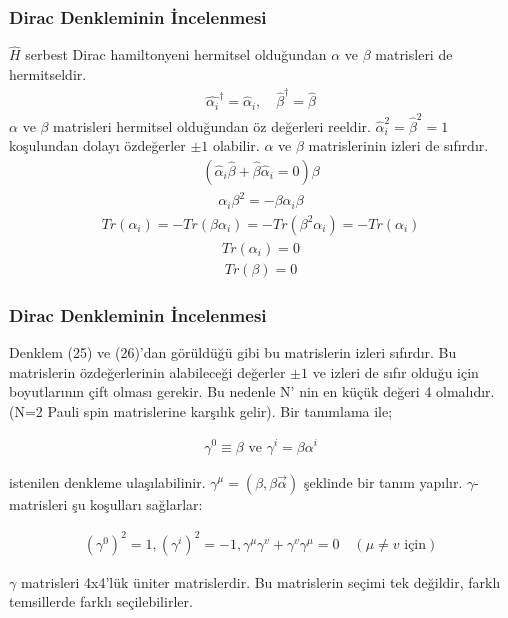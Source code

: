 \documentclass[aspectratio=169,10pt]{beamer}
\begin{document}
	\begin{frame}[allowframebreaks]
	\frametitle{Dirac Denkleminin İncelenmesi}
$\hat{H}$ serbest Dirac hamiltonyeni hermitsel olduğundan $\alpha$ ve $\beta$ matrisleri de hermitseldir.
\begin{align}
    \hat{\alpha_{i}}^{\dag} = \hat{\alpha}_{i}, \quad  \hat{\beta}^{\dag} = \hat{\beta}
\end{align}
$\alpha$ ve $\beta$ matrisleri hermitsel olduğundan öz değerleri reeldir. $\hat{\alpha}_{i}^{2} = \hat{\beta}^{2}  = 1$ koşulundan dolayı özdeğerler $\pm 1$ olabilir. $\alpha$ ve $\beta$ matrislerinin izleri de sıfırdır.
\begin{align}
    ( \hat{\alpha}_{i}\hat{\beta} + \hat{\beta}\hat{\alpha}_{i}=0)\beta
\end{align}
\begin{align}
    \alpha_{i} \beta^{2} = - \beta \alpha_{i} \beta
\end{align}
\begin{align}
    Tr(\alpha_{i}) = -Tr(\beta \alpha_{i}) = -Tr(\beta^{2}\alpha_{i}) = -Tr(\alpha_{i})
\end{align}
\begin{align}
    Tr(\alpha_{i}) = 0 
\end{align}
\begin{align}
    Tr(\beta) = 0 
\end{align}
\end{frame}

	\begin{frame}[allowframebreaks]
	\frametitle{Dirac Denkleminin İncelenmesi}
Denklem (25) ve (26)’dan görüldüğü gibi bu matrislerin izleri sıfırdır. Bu matrislerin
özdeğerlerinin alabileceği değerler $\pm 1$ ve izleri de sıfır olduğu için boyutlarının çift olması gerekir. Bu nedenle N’ nin en küçük değeri 4 olmalıdır. (N=2 Pauli spin matrislerine karşılık gelir). Bir tanımlama ile;

\begin{align}
    \gamma^{0} \equiv \beta \textrm{ ve } \gamma^{i} = \beta \alpha^{i}
\end{align}

istenilen denkleme ulaşılabilinir. $\gamma^{\mu}=(\beta, \beta \Vec{\alpha})$ şeklinde bir tanım yapılır. $\gamma$- matrisleri şu koşulları sağlarlar:

\begin{align}
    (\gamma^{0})^{2} =1, (\gamma^{i})^{2} = -1, \gamma^{\mu} \gamma^{v}   + \gamma^{v}  \gamma^{\mu}  = 0 \quad (\mu \neq v \textrm{ için})
\end{align}

$\gamma$ matrisleri 4x4’lük üniter matrislerdir. Bu matrislerin seçimi tek değildir, farklı temsillerde farklı seçilebilirler.

\end{frame}
\end{document}
